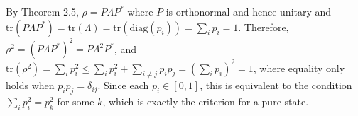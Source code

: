 \par By Theorem 2.5, $\rho = P \Lambda P^*$ where $P$ is orthonormal and hence
unitary and $\mathrm{tr} \left( P \Lambda P^* \right) = \mathrm{tr} \left(
\Lambda \right) = \mathrm{tr} \left( \mathrm{diag} \left( p_i \right) \right) =
\sum_i{p_i} = 1$.  Therefore, $\rho^2 = \left( P \Lambda P^* \right)^2 = P
\Lambda^2 P^*$, and $\mathrm{tr} \left( \rho^2 \right) = \sum_i{p_i^2} \le
\sum_i{p_i^2} + \sum_{i \ne j}{p_i p_j} = \left( \sum_i{p_i} \right)^2 = 1$,
where equality only holds when $p_i p_j = \delta_{ij}$. Since each $p_i \in [0,
1]$, this is equivalent to the condition $\sum_i{p_i^2} = p_k^2$ for some $k$,
which is exactly the criterion for a pure state.
